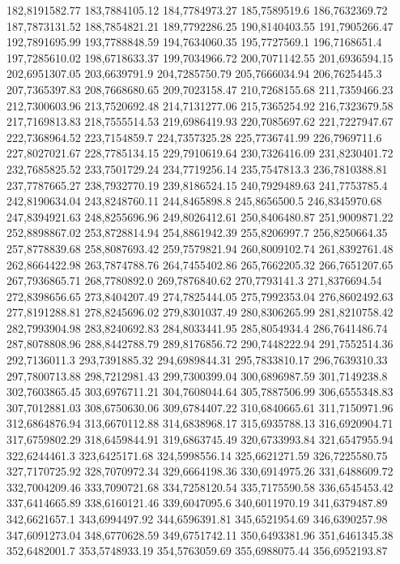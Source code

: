 182,8191582.77
183,7884105.12
184,7784973.27
185,7589519.6
186,7632369.72
187,7873131.52
188,7854821.21
189,7792286.25
190,8140403.55
191,7905266.47
192,7891695.99
193,7788848.59
194,7634060.35
195,7727569.1
196,7168651.4
197,7285610.02
198,6718633.37
199,7034966.72
200,7071142.55
201,6936594.15
202,6951307.05
203,6639791.9
204,7285750.79
205,7666034.94
206,7625445.3
207,7365397.83
208,7668680.65
209,7023158.47
210,7268155.68
211,7359466.23
212,7300603.96
213,7520692.48
214,7131277.06
215,7365254.92
216,7323679.58
217,7169813.83
218,7555514.53
219,6986419.93
220,7085697.62
221,7227947.67
222,7368964.52
223,7154859.7
224,7357325.28
225,7736741.99
226,7969711.6
227,8027021.67
228,7785134.15
229,7910619.64
230,7326416.09
231,8230401.72
232,7685825.52
233,7501729.24
234,7719256.14
235,7547813.3
236,7810388.81
237,7787665.27
238,7932770.19
239,8186524.15
240,7929489.63
241,7753785.4
242,8190634.04
243,8248760.11
244,8465898.8
245,8656500.5
246,8345970.68
247,8394921.63
248,8255696.96
249,8026412.61
250,8406480.87
251,9009871.22
252,8898867.02
253,8728814.94
254,8861942.39
255,8206997.7
256,8250664.35
257,8778839.68
258,8087693.42
259,7579821.94
260,8009102.74
261,8392761.48
262,8664422.98
263,7874788.76
264,7455402.86
265,7662205.32
266,7651207.65
267,7936865.71
268,7780892.0
269,7876840.62
270,7793141.3
271,8376694.54
272,8398656.65
273,8404207.49
274,7825444.05
275,7992353.04
276,8602492.63
277,8191288.81
278,8245696.02
279,8301037.49
280,8306265.99
281,8210758.42
282,7993904.98
283,8240692.83
284,8033441.95
285,8054934.4
286,7641486.74
287,8078808.96
288,8442788.79
289,8176856.72
290,7448222.94
291,7552514.36
292,7136011.3
293,7391885.32
294,6989844.31
295,7833810.17
296,7639310.33
297,7800713.88
298,7212981.43
299,7300399.04
300,6896987.59
301,7149238.8
302,7603865.45
303,6976711.21
304,7608044.64
305,7887506.99
306,6555348.83
307,7012881.03
308,6750630.06
309,6784407.22
310,6840665.61
311,7150971.96
312,6864876.94
313,6670112.88
314,6838968.17
315,6935788.13
316,6920904.71
317,6759802.29
318,6459844.91
319,6863745.49
320,6733993.84
321,6547955.94
322,6244461.3
323,6425171.68
324,5998556.14
325,6621271.59
326,7225580.75
327,7170725.92
328,7070972.34
329,6664198.36
330,6914975.26
331,6488609.72
332,7004209.46
333,7090721.68
334,7258120.54
335,7175590.58
336,6545453.42
337,6414665.89
338,6160121.46
339,6047095.6
340,6011970.19
341,6379487.89
342,6621657.1
343,6994497.92
344,6596391.81
345,6521954.69
346,6390257.98
347,6091273.04
348,6770628.59
349,6751742.11
350,6493381.96
351,6461345.38
352,6482001.7
353,5748933.19
354,5763059.69
355,6988075.44
356,6952193.87
